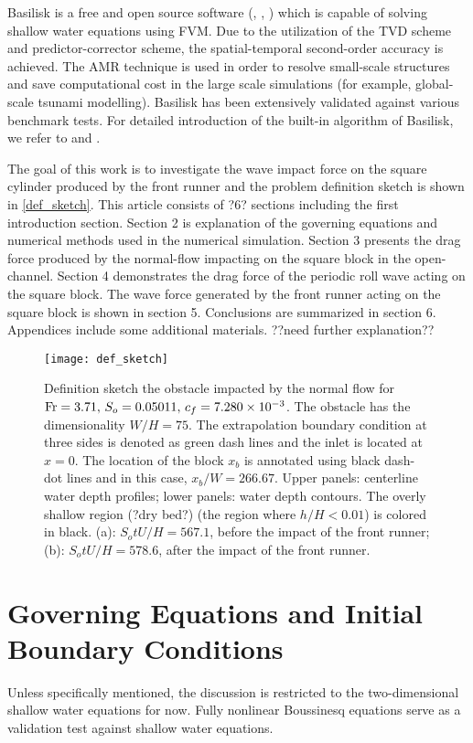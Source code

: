 \documentclass{jfm}
\newcommand{\fr}{{\rm{Fr}}}
\begin{document}
\begin{itemize}
	Basilisk is a free and open source software (\cite{Popinet2021}, \cite{Popinet2015}, \cite{Popinet2003}) which is capable of solving shallow water equations using FVM. Due to the utilization of the TVD scheme and predictor-corrector scheme, the spatial-temporal second-order accuracy is achieved. The AMR technique is used in order to resolve small-scale structures and save computational cost in the large scale simulations (for example, global-scale tsunami modelling). Basilisk has been extensively validated against various benchmark tests.  For detailed introduction of the built-in algorithm of Basilisk, we refer to \cite{Popinet2015} and \cite{Popinet2011}. 
\end{itemize}

The goal of this work is to investigate the wave impact force on the square cylinder produced by the front runner and the problem definition sketch is shown in \autoref{def_sketch}. This article consists of ?6? sections including the first introduction section.  Section 2 is explanation of the governing equations and numerical methods used in the numerical simulation. Section 3 presents the drag force produced by the normal-flow impacting on the square block in the open-channel. Section 4 demonstrates the drag force of the periodic roll wave acting on the square block. The wave force generated by the front runner acting on the square block is shown in section 5. Conclusions are summarized in section 6. Appendices include some additional materials. ??need further explanation??


\begin{figure}
	\centerline{\texttt{[image: def\_sketch]}}
	\caption{Definition sketch the obstacle impacted by the normal flow for $\fr=3.71,\,S_o=0.05011,\,c_f=7.280\times10^{-3}$. The obstacle has the dimensionality $W/H=75$. The extrapolation boundary condition at three sides is denoted as green dash lines and the inlet is located at $x=0$. The location of the block $x_b$ is annotated using black dash-dot lines and in this case, $x_b/W=266.67$. Upper panels: centerline water depth profiles; lower panels: water depth contours. The overly shallow region (?dry bed?) (the region where $h/H<0.01$) is colored in black. (a): $S_otU/H=567.1$, before the impact of the front runner; (b): $S_otU/H=578.6$, after the impact of the front runner.}
	\label{def_sketch}
\end{figure}


\section{Governing Equations and Initial Boundary Conditions}
Unless specifically mentioned, the discussion is restricted to the two-dimensional shallow water equations for now.  Fully nonlinear Boussinesq equations serve as a validation test against shallow water equations.
\end{document}
